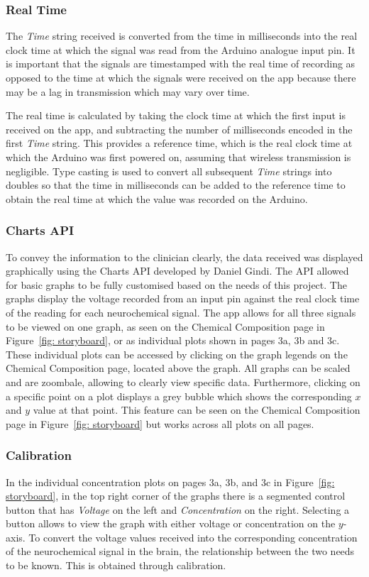 \subsubsection{Real Time} \label{section: real time}
The \textit{Time} string received is converted from the time in milliseconds into the real clock time at which the signal was read from the Arduino analogue input pin. It is important that the signals are timestamped with the real time of recording as opposed to the time at which the signals were received on the app because there may be a lag in transmission which may vary over time.

The real time is calculated by taking the clock time at which the first input is received on the app, and subtracting the number of milliseconds encoded in the first \textit{Time} string. This provides a reference time, which is the real clock time at which the Arduino was first powered on, assuming that wireless transmission is negligible. Type casting is used to convert all subsequent \textit{Time} strings into doubles so that the time in milliseconds can be added to the reference time to obtain the real time at which the value was recorded on the Arduino.


\subsubsection{Charts API}
To convey the information to the clinician clearly, the data received was displayed graphically using the Charts API developed by Daniel Gindi. The API allowed for basic graphs to be fully customised based on the needs of this project. The graphs display the voltage recorded from an input pin against the real clock time of the reading for each neurochemical signal. The app allows for all three signals to be viewed on one graph, as seen on the Chemical Composition page in Figure~\ref{fig: storyboard}, or as individual plots shown in pages 3a, 3b and 3c. These individual plots can be accessed by clicking on the graph legends on the Chemical Composition page, located above the graph. All graphs can be scaled and are zoombale, allowing to clearly view specific data. Furthermore, clicking on a specific point on a plot displays a grey bubble which shows the corresponding $x$ and $y$ value at that point. This feature can be seen on the Chemical Composition page in Figure~\ref{fig: storyboard} but works across all plots on all pages.


\subsubsection{Calibration}
In the individual concentration plots on pages 3a, 3b, and 3c in Figure~\ref{fig: storyboard}, in the top right corner of the graphs there is a segmented control button that has \textit{Voltage} on the left and \textit{Concentration} on the right. Selecting a button allows to view the graph with either voltage or concentration on the $y$-axis. To convert the voltage values received into the corresponding concentration of the neurochemical signal in the brain, the relationship between the two needs to be known. This is obtained through calibration. 

